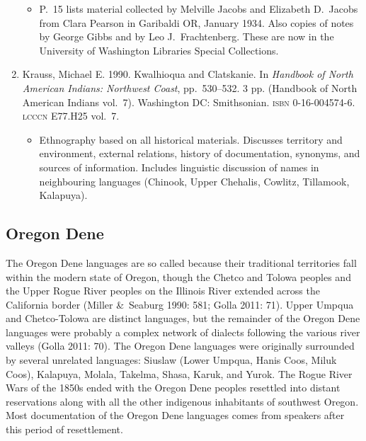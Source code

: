 \documentclass[12pt,letterpaper,oneside,article]{memoir}
\begin{document}
\begin{enumerate}
\begin{itemize}
	\item	P.\ 15 lists material collected by Melville Jacobs and Elizabeth D.\ Jacobs
		from Clara Pearson in Garibaldi OR, January 1934.
		Also copies of notes by George Gibbs and by Leo J.\ Frachtenberg.
		These are now in the University of Washington Libraries Special Collections.
	\end{itemize}
\item	Krauss, Michael E.
	1990.
	Kwalhioqua and Clatskanie.
	In \textit{Handbook of North American Indians: Northwest Coast}, pp.\ 530–532.
	3 pp.
	(Handbook of North American Indians vol.\ 7).
	Washington DC: Smithsonian.
	\textsc{isbn} 0-16-004574-6.
	\textsc{lcccn} E77.H25 vol.\ 7.
	\begin{itemize}
	\item	Ethnography based on all historical materials.
		Discusses territory and environment, external relations, history of
		documentation, synonyms, and sources of information.
		Includes linguistic discussion of names in neighbouring languages
		(Chinook, Upper Chehalis, Cowlitz, Tillamook, Kalapuya).
	\end{itemize}
\end{enumerate}

\subsection{Oregon Dene}\label{sec:pacific-oregon}

The Oregon Dene languages are so called because their traditional territories fall within the modern state of Oregon, though the Chetco and Tolowa peoples and the Upper Rogue River peoples on the Illinois River extended across the California border (Miller \&\ Seaburg 1990: 581; Golla 2011: 71).
Upper Umpqua and Chetco-Tolowa are distinct languages, but the remainder of the Oregon Dene languages were probably a complex network of dialects following the various river valleys (Golla 2011: 70).
The Oregon Dene languages were originally surrounded by several unrelated languages: Siuslaw (Lower Umpqua, Hanis Coos, Miluk Coos), Kalapuya, Molala, Takelma, Shasa, Karuk, and Yurok.
The Rogue River Wars of the 1850s ended with the Oregon Dene peoples resettled into distant reservations along with all the other indigenous inhabitants of southwest Oregon.
Most documentation of the Oregon Dene languages comes from speakers after this period of resettlement.
\end{document}
